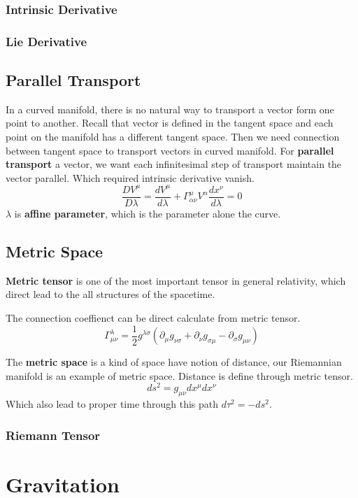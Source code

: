 \documentclass[12pt]{article}
\theoremstyle{mystyle}{\newtheorem{definition}{Definition}[section]}
\theoremstyle{mystyle}{\newtheorem{theorem}[definition]{Theorem}}
\theoremstyle{mystyle}{\newtheorem*{remark}{Remark}}
\theoremstyle{mystyle}{\newtheorem*{example}{Example}}
\theoremstyle{mystyle}{\newtheorem*{examples}{Examples}}
\theoremstyle{cstyle}{\newtheorem*{cthm}{}}
\begin{document}
\subsubsection{Intrinsic Derivative}

\subsubsection{Lie Derivative}

\subsection{Parallel Transport}
In a curved manifold, there is no natural way to transport a vector form one point to another.
Recall that vector is defined in the tangent space and each point on the manifold has a different tangent space.
Then we need connection between tangent space to transport vectors in curved manifold.
For \textbf{parallel transport} a vector, we want each infinitesimal step of transport maintain the vector parallel.
Which required intrinsic derivative vanish.\[\frac{DV^{\mu}}{D\lambda} =
  \frac{dV^{\mu}}{d\lambda}+ \Gamma^{\mu}_{\alpha\nu}V^{\alpha}\frac{dx^{\nu}}{d\lambda} = 0\]
\(\lambda\) is \textbf{affine parameter}, which is the parameter alone the curve.

\subsection{Metric Space}
\textbf{Metric tensor} is one of the most important tensor in general relativity,
which direct lead to the all structures of the spacetime.
\begin{example}
  The connection coeffienct can be direct calculate from metric tensor.
  \[\Gamma_{\mu\nu}^{\lambda} = \frac{1}{2}g^{\lambda\sigma}(\partial_{\mu}g_{\nu\sigma}+ \partial_{\nu}g_{\sigma\mu}
    - \partial_{\sigma}g_{\mu\nu})\]
\end{example}
The \textbf{metric space} is a kind of space have notion of distance,
our Riemannian manifold is an example of metric space.
Distance is define through metric tensor.\[ds^2 = g_{\mu \nu} dx^{\mu} dx^{\nu}\]
Which also lead to proper time through this path \(d\tau^2 = - ds^2\).

\subsubsection{Riemann Tensor}

\section{Gravitation}
\end{document}
